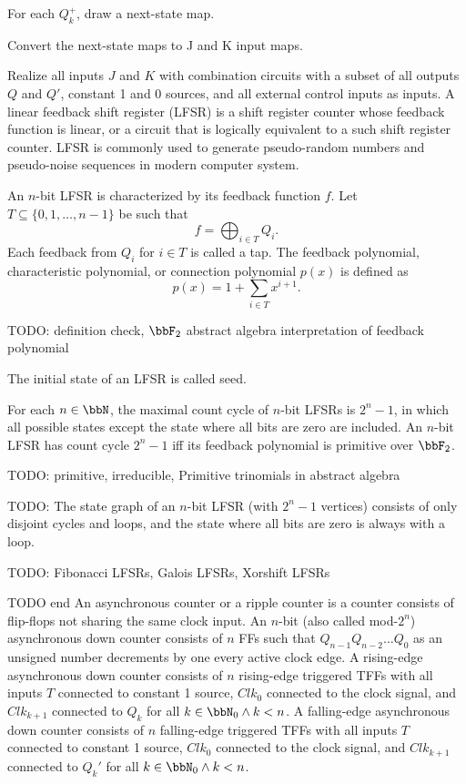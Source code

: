 \documentclass[a4paper,12pt]{report}
\begin{document}
\ben
\item For each $Q^+_k$, draw a next-state map.
\item Convert the next-state maps to J and K input maps.
\item Realize all inputs $J$ and $K$ with combination circuits with a subset of all outputs $Q$ and $Q'$, constant 1 and 0 sources, and all external control inputs as inputs.
\een
{}
A linear feedback shift register (LFSR) is a shift register counter whose feedback function is linear, or a circuit that is logically equivalent to a such shift register counter. LFSR is commonly used to generate pseudo-random numbers and pseudo-noise sequences in modern computer system.

An $n$-bit LFSR is characterized by its feedback function $f$. Let $T\subseteq\{0,1,\ldots,n-1\}$ be such that
\[f=\bigoplus_{i\in T}Q_i.\]
Each feedback from $Q_i$ for $i\in T$ is called a tap. The feedback polynomial, characteristic polynomial, or connection polynomial $p(x)$ is defined as
\[p(x)=1+\sum_{i\in T}x^{i+1}.\]

TODO: definition check, $\bbF_2$ abstract algebra interpretation of feedback polynomial

The initial state of an LFSR is called seed.

For each $n\in\bbN$, the maximal count cycle of $n$-bit LFSRs is $2^n-1$, in which all possible states except the state where all bits are zero are included. An $n$-bit LFSR has count cycle $2^n-1$ iff its feedback polynomial is primitive over $\bbF_2$.

TODO: primitive, irreducible, Primitive trinomials in abstract algebra

TODO: The state graph of an $n$-bit LFSR (with $2^n-1$ vertices) consists of only disjoint cycles and loops, and the state where all bits are zero is always with a loop.

TODO: Fibonacci LFSRs, Galois LFSRs, Xorshift LFSRs

TODO end
An asynchronous counter or a ripple counter is a counter consists of flip-flops not sharing the same clock input.
An $n$-bit (also called mod-$2^n$) asynchronous down counter consists of $n$ FFs such that $Q_{n-1}Q_{n-2}\ldots Q_0$ as an unsigned number decrements by one every active clock edge. A rising-edge asynchronous down counter consists of $n$ rising-edge triggered TFFs with all inputs $T$ connected to constant 1 source, $Clk_0$ connected to the clock signal, and $Clk_{k+1}$ connected to $Q_k$ for all $k\in\bbN_0\land k<n$. A falling-edge asynchronous down counter consists of $n$ falling-edge triggered TFFs with all inputs $T$ connected to constant 1 source, $Clk_0$ connected to the clock signal, and $Clk_{k+1}$ connected to $Q_k'$ for all $k\in\bbN_0\land k<n$.
\end{document}
